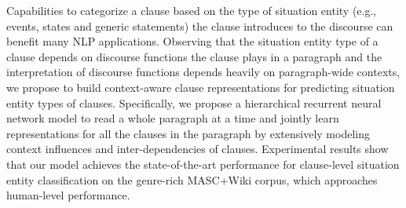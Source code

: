 Capabilities to categorize a clause based on the type of situation entity (e.g., events, states and generic statements) the clause introduces to the discourse can benefit many NLP applications. Observing that the situation entity type of a clause depends on discourse functions the clause plays in a paragraph and the interpretation of discourse functions depends heavily on paragraph-wide contexts, we propose to build context-aware clause representations for predicting situation entity types of clauses. Specifically, we propose a hierarchical recurrent neural network model to read a whole paragraph at a time and jointly learn representations for all the clauses in the paragraph by extensively modeling context influences and inter-dependencies of clauses. Experimental results show that our model achieves the state-of-the-art performance for clause-level situation entity classification on the genre-rich MASC+Wiki corpus, which approaches human-level performance.
